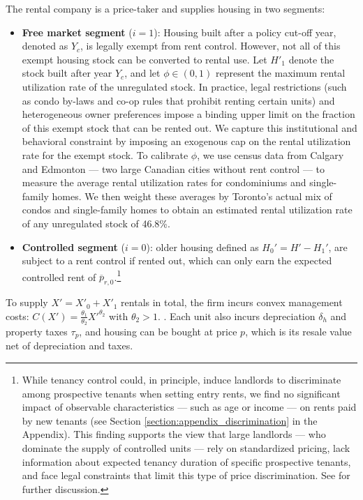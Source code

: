 \documentclass[parskip=full]{article}
\begin{document}
The rental company is a price-taker and supplies housing in two segments:
\begin{itemize}
    \item \textbf{Free market segment} ($i=1$): Housing built after a policy cut-off year, denoted as $Y_{c}$, is legally exempt from rent control. However, not all of this exempt housing stock can be converted to rental use. Let $H'_1$ denote the stock built after year $Y_{c}$, and let $\phi \in (0,1)$ represent the maximum rental utilization rate of the unregulated stock. In practice, legal restrictions (such as condo by-laws and co-op rules that prohibit renting certain units) and heterogeneous owner preferences impose a binding upper limit on the fraction of this exempt stock that can be rented out. We capture this institutional and behavioral constraint by imposing an exogenous cap on the rental utilization rate for the exempt stock. To calibrate $\phi$, we use census data from Calgary and Edmonton — two large Canadian cities without rent control — to measure the average rental utilization rates for condominiums and single-family homes. We then weight these averages by Toronto’s actual mix of condos and single-family homes to obtain an estimated rental utilization rate of any unregulated stock of 46.8\%.
    \item \textbf{Controlled segment} ($i=0$): older housing defined as $H_0'=H'-H_1'$, are subject to a rent control if rented out, which can only earn the expected controlled rent of $\overline{p}_{r,0}$.\footnote{While tenancy control could, in principle, induce landlords to discriminate among prospective tenants when setting entry rents, we find no significant impact of observable characteristics — such as age or income — on rents paid by new tenants (see Section \ref{section:appendix_discrimination} in the Appendix). This finding supports the view that large landlords — who dominate the supply of controlled units — rely on standardized pricing, lack information about expected tenancy duration of specific prospective tenants, and face legal constraints that limit this type of price discrimination. See \citet{be-2000} for further discussion.}
\end{itemize}

To supply $X'=X'_0+X'_1$ rentals in total, the firm incurs convex management costs: $C(X')=\frac{\theta_1}{\theta_2}X'^{\theta_2}$ with $\theta_2>1.$ \citep{garrigaeetal-2009}. Each unit also incurs depreciation $\delta_h$ and property taxes $\tau_p$, and housing can be bought at price $p$, which is its resale value net of depreciation and taxes.
\end{document}
